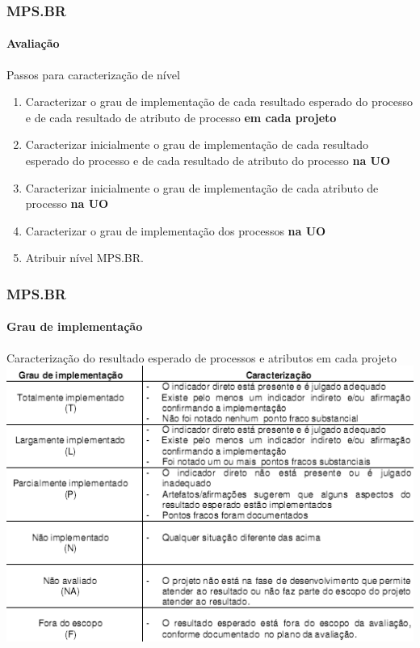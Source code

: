\begin{frame}
	\frametitle{MPS.BR}
	\framesubtitle{Avaliação}
	
	\begin{block:procedure}{Passos para caracterização de nível}
		\begin{enumerate}
			\item Caracterizar o grau de implementação de cada resultado esperado do
			processo e de cada resultado de atributo de processo \textbf{em cada projeto}
		
			\item Caracterizar inicialmente o grau de implementação de cada resultado
			esperado do processo e de cada resultado de atributo do processo \textbf{na UO}
		
			\item Caracterizar inicialmente o grau de implementação de cada atributo de
			processo \textbf{na UO}

			\item Caracterizar o grau de implementação dos processos \textbf{na UO}

			\item Atribuir nível MPS.BR.
		\end{enumerate}
	\end{block:procedure}
\end{frame}


\begin{frame}
	\frametitle{MPS.BR}
	\framesubtitle{Grau de implementação}
	
	\begin{block:fact}{Caracterização do resultado esperado de processos e
	atributos em cada projeto}
		\centering
		\includegraphics[width=.95\textwidth]{software-engineering/project-management/process/process-quality/mpsbr/mpsbr-implementation-ratings}
	\end{block:fact}
\end{frame}



